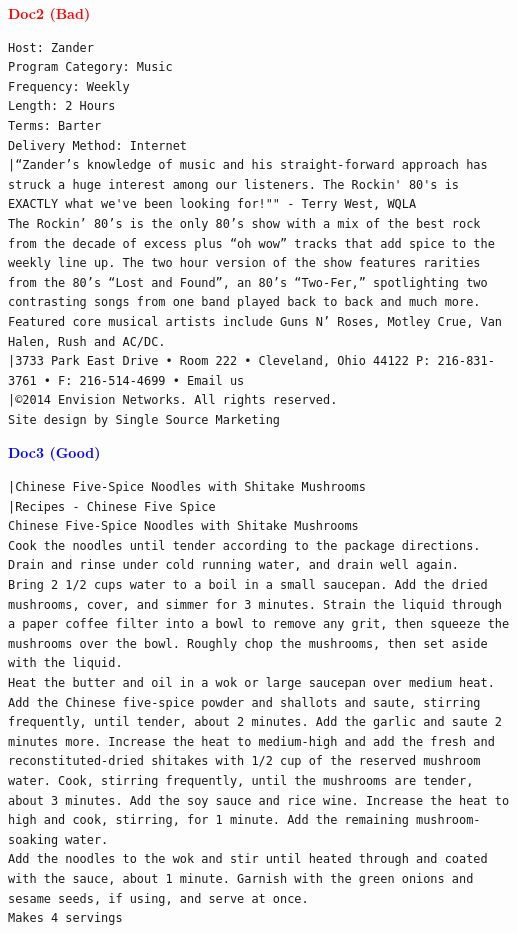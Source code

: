 \documentclass{article}
\begin{document}
\textcolor{red}{\textbf{Doc2 (Bad)}}
\begin{scriptsize}
\begin{Verbatim}[frame=single, framesep=3mm, breaklines=true]
Host: Zander
Program Category: Music
Frequency: Weekly
Length: 2 Hours
Terms: Barter
Delivery Method: Internet
|“Zander’s knowledge of music and his straight-forward approach has struck a huge interest among our listeners. The Rockin' 80's is EXACTLY what we've been looking for!"" - Terry West, WQLA
The Rockin’ 80’s is the only 80’s show with a mix of the best rock from the decade of excess plus “oh wow” tracks that add spice to the weekly line up. The two hour version of the show features rarities from the 80’s “Lost and Found”, an 80’s “Two-Fer,” spotlighting two contrasting songs from one band played back to back and much more. Featured core musical artists include Guns N’ Roses, Motley Crue, Van Halen, Rush and AC/DC.
|3733 Park East Drive • Room 222 • Cleveland, Ohio 44122 P: 216-831-3761 • F: 216-514-4699 • Email us
|©2014 Envision Networks. All rights reserved.
Site design by Single Source Marketing
\end{Verbatim}
\end{scriptsize}

\clearpage
\textcolor{blue}{\textbf{Doc3 (Good)}}
\begin{scriptsize}
\begin{Verbatim}[frame=single, framesep=3mm, breaklines=true]
|Chinese Five-Spice Noodles with Shitake Mushrooms
|Recipes - Chinese Five Spice
Chinese Five-Spice Noodles with Shitake Mushrooms
Cook the noodles until tender according to the package directions. Drain and rinse under cold running water, and drain well again.
Bring 2 1/2 cups water to a boil in a small saucepan. Add the dried mushrooms, cover, and simmer for 3 minutes. Strain the liquid through a paper coffee filter into a bowl to remove any grit, then squeeze the mushrooms over the bowl. Roughly chop the mushrooms, then set aside with the liquid.
Heat the butter and oil in a wok or large saucepan over medium heat. Add the Chinese five-spice powder and shallots and saute, stirring frequently, until tender, about 2 minutes. Add the garlic and saute 2 minutes more. Increase the heat to medium-high and add the fresh and reconstituted-dried shitakes with 1/2 cup of the reserved mushroom water. Cook, stirring frequently, until the mushrooms are tender, about 3 minutes. Add the soy sauce and rice wine. Increase the heat to high and cook, stirring, for 1 minute. Add the remaining mushroom-soaking water.
Add the noodles to the wok and stir until heated through and coated with the sauce, about 1 minute. Garnish with the green onions and sesame seeds, if using, and serve at once.
Makes 4 servings
\end{Verbatim}
\end{scriptsize}
\end{document}
